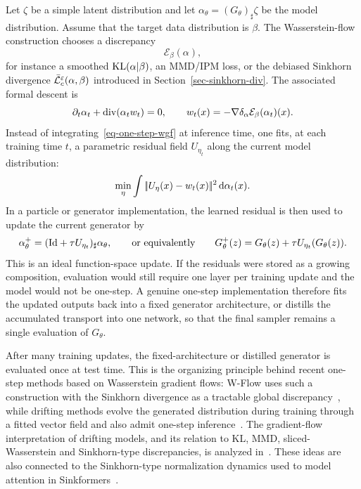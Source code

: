 Let $\zeta$ be a simple latent distribution and let $\alpha_\theta=(G_\theta)_\sharp\zeta$ be the model distribution. Assume that the target data distribution is $\beta$. The Wasserstein-flow construction chooses a discrepancy
\[
	\mathcal E_\beta(\alpha),
\]
for instance a smoothed $\operatorname{KL}(\alpha|\beta)$, an MMD/IPM loss, or the debiased Sinkhorn divergence $\bar{\mathcal{L}}_c^\varepsilon(\alpha,\beta)$ introduced in Section~\ref{sec-sinkhorn-div}. The associated formal descent is
\begin{equation}\label{eq-one-step-wgf}
	\partial_t\alpha_t+\operatorname{div}(\alpha_t w_t)=0,
	\qquad
	w_t(x)=-\nabla\delta_\alpha \mathcal E_\beta(\alpha_t)(x).
\end{equation}
Instead of integrating~\eqref{eq-one-step-wgf} at inference time, one fits, at each training time $t$, a parametric residual field $U_{\eta_t}$ along the current model distribution:
\begin{equation}\label{eq-one-step-l2-fit}
	\min_\eta \int
		|\!| U_\eta(x)-w_t(x) |\!|^2
		\,\mathrm{d}\alpha_t(x).
\end{equation}
In a particle or generator implementation, the learned residual is then used to update the current generator by
\[
	\alpha_{\theta}^{+}
	=
	(\mathrm{Id}+\tau U_{\eta_t})_\sharp \alpha_\theta,
	\qquad\text{or equivalently}\qquad
	G_\theta^{+}(z)=G_\theta(z)+\tau U_{\eta_t}(G_\theta(z)).
\]
This is an ideal function-space update. If the residuals were stored as a growing composition, evaluation would still require one layer per training update and the model would not be one-step. A genuine one-step implementation therefore fits the updated outputs back into a fixed generator architecture, or distills the accumulated transport into one network, so that the final sampler remains a single evaluation of $G_\theta$.


After many training updates, the fixed-architecture or distilled generator is evaluated once at test time. This is the organizing principle behind recent one-step methods based on Wasserstein gradient flows: W-Flow uses such a construction with the Sinkhorn divergence as a tractable global discrepancy~\cite{Han2026WFlow}, while drifting methods evolve the generated distribution during training through a fitted vector field and also admit one-step inference~\cite{Deng2026Drifting}. The gradient-flow interpretation of drifting models, and its relation to KL, MMD, sliced-Wasserstein and Sinkhorn-type discrepancies, is analyzed in~\cite{Gretton2026DriftingWGF,He2026SinkhornDrifting}. These ideas are also connected to the Sinkhorn-type normalization dynamics used to model attention in Sinkformers~\cite{Sander2022Sinkformers}.

